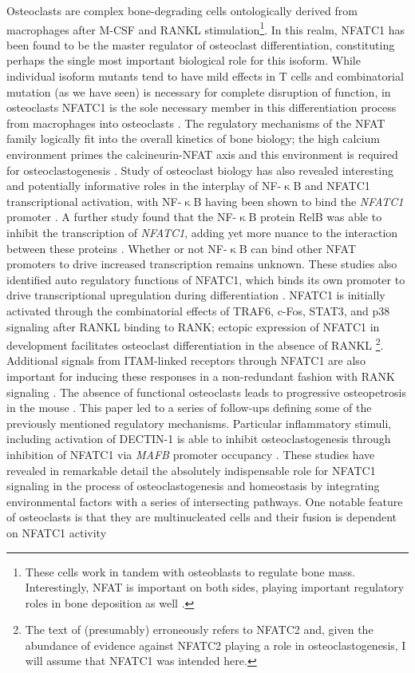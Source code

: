 Osteoclasts are complex bone\hyp{}degrading cells ontologically derived from macrophages after M\hyp{}CSF and RANKL stimulation\footnote{These cells work in tandem with osteoblasts to regulate bone mass. Interestingly, NFAT is important on both sides, playing important regulatory roles in bone deposition as well \citep{Winslow2006}.}. In this realm, NFATC1 has been found to be the master regulator of osteoclast differentiation, constituting perhaps the single most important biological role for this isoform. While individual isoform mutants tend to have mild effects in T cells and combinatorial mutation (as we have seen) is necessary for complete disruption of function, in osteoclasts NFATC1 is the sole necessary member in this differentiation process from macrophages into osteoclasts \citep{Kim2014}. The regulatory mechanisms of the NFAT family logically fit into the overall kinetics of bone biology; the high calcium environment primes the calcineurin\hyp{}NFAT axis and this environment is required for osteoclastogenesis \citep{NegishiKoga2009}. Study of osteoclast biology has also revealed interesting and potentially informative roles in the interplay of NF\hyp{}$\upkappa$B and NFATC1 transcriptional activation, with NF\hyp{}$\upkappa$B having been shown to bind the \textit{NFATC1} promoter \citep{Muhammad2014}. A further study found that the NF-$\upkappa$B protein RelB was able to inhibit the transcription of \textit{NFATC1}, adding yet more nuance to the interaction between these proteins \citep{Zhao2015}. Whether or not NF\hyp{}$\upkappa$B can bind other NFAT promoters to drive increased transcription remains unknown. These studies also identified auto regulatory functions of NFATC1, which binds its own promoter to drive transcriptional upregulation during differentiation \citep{Asagiri2005}. NFATC1 is initially activated through the combinatorial effects of TRAF6, c\hyp{}Fos, STAT3, and p38 signaling after RANKL binding to RANK; ectopic expression of NFATC1 in development facilitates osteoclast differentiation in the absence of RANKL \citep{Takayanagi2002, Huang2006, Yang2019, Matsumoto2004, Huang2020}\footnote{The text of \citep{Huang2020} (presumably) erroneously refers to NFATC2 and, given the abundance of evidence against NFATC2 playing a role in osteoclastogenesis, I will assume that NFATC1 was intended here.}. Additional signals from ITAM\hyp{}linked receptors through NFATC1 are also important for inducing these responses in a non\hyp{}redundant fashion with RANK signaling \citep{Koga2004}. The absence of functional osteoclasts leads to progressive osteopetrosis in the mouse \citep{Takayanagi2002, Kim2014}. This paper led to a series of follow\hyp{}ups defining some of the previously mentioned regulatory mechanisms. Particular inflammatory stimuli, including activation of DECTIN\hyp{}1 is able to inhibit osteoclastogenesis through inhibition of NFATC1 via \textit{MAFB} promoter occupancy \citep{Zhu2017}. These studies have revealed in remarkable detail the absolutely indispensable role for NFATC1 signaling in the process of osteoclastogenesis and homeostasis by integrating environmental factors with a series of intersecting pathways. One notable feature of osteoclasts is that they are multinucleated cells and their fusion is dependent on NFATC1 activity 
